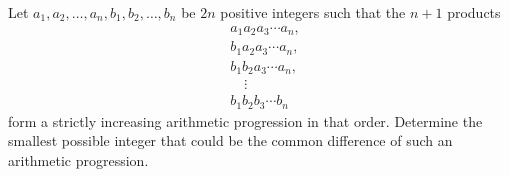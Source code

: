 Let $a_1, a_2, \ldots, a_n, b_1, b_2, \ldots, b_n$ be $2n$ positive integers such that the $n+1$ products
\[
\begin{aligned}
&a_1 a_2 a_3 \cdots a_n, \\
&b_1 a_2 a_3 \cdots a_n, \\
&b_1 b_2 a_3 \cdots a_n, \\
&\quad\vdots \\
&b_1 b_2 b_3 \cdots b_n
\end{aligned}
\]
form a strictly increasing arithmetic progression in that order. Determine the smallest possible integer that could be the common difference of such an arithmetic progression.
